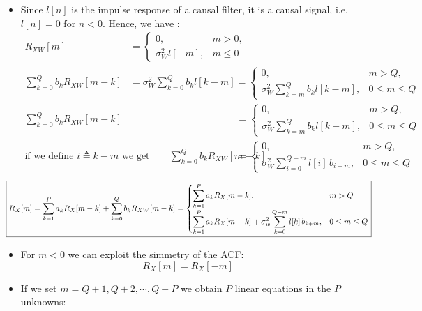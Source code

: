 \begin{itemize}
\item Since \(l[n]\) is the impulse response of a causal filter, it is a causal signal, i.e. \(l[n]=0\) for \(n<0\). Hence, we have :
\begin{align*}
R_{XW}[m]
&=
\begin{cases}
0,            & m > 0,\\[2pt]
\sigma_{W}^{2} l[-m], & m \le 0
\end{cases}
\\[10pt]
\sum_{k=0}^{Q} b_{k} R_{XW}[m-k]
&= \sigma_{W}^{2} \sum_{k=0}^{Q} b_{k} l[k-m]
=
\begin{cases}
0, & m > Q,\\[4pt]
\sigma_{W}^{2} \displaystyle\sum_{k=m}^{Q} b_{k} l[k-m], & 0 \le m \le Q
\end{cases}
\end{align*}
\begin{align*}
\sum_{k=0}^{Q} b_{k} R_{XW}[m-k]
&=
\begin{cases}
0, & m > Q,\\[4pt]
\sigma_{W}^{2} \displaystyle\sum_{k=m}^{Q} b_{k} l[k-m], & 0 \le m \le Q
\end{cases}
\\[10pt]
\text{if we define } i \triangleq k-m \text{ we get} \qquad
\sum_{k=0}^{Q} b_{k} R_{XW}[m-k]
&=
\begin{cases}
0, & m > Q,\\[4pt]
\sigma_{W}^{2} \displaystyle\sum_{i=0}^{Q-m} l[i]\, b_{i+m}, & 0 \le m \le Q
\end{cases}
\end{align*}
\[\hspace{-2em}\boxed{R_X[m] = \sum_{k=1}^{P} a_k R_X[m-k] + \sum_{k=0}^{Q} b_k R_{XW}[m-k]
=
\begin{cases}
\displaystyle\sum_{k=1}^{P} a_k R_X[m-k], & m>Q \\[10pt]
\displaystyle\sum_{k=1}^{P} a_k R_X[m-k] 
        + \sigma_w^2 \sum_{k=0}^{Q-m} l[k]\,b_{k+m}, & 0\le m\le Q
\end{cases}}\]
\item For \(m<0\) we can exploit the simmetry of the ACF:
\[
R_X[m]=R_X[-m]
\]
\item If we set \(m=Q+1,Q+2,\cdots,Q+P\) we obtain \(P\) linear equations in the \(P\) unknowns:


\end{itemize}
